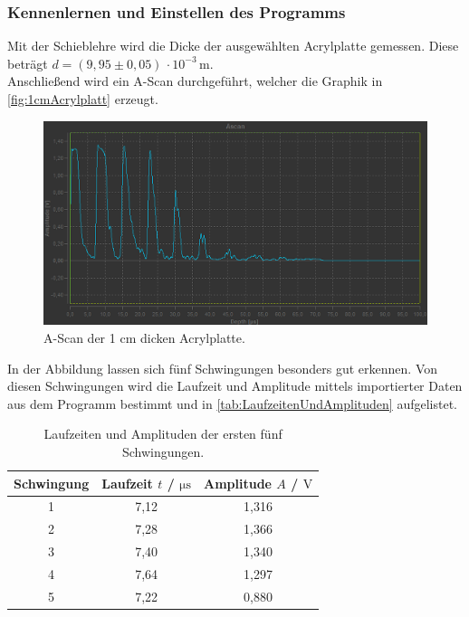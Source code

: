 \subsubsection{Kennenlernen und Einstellen des Programms}

Mit der Schieblehre wird die Dicke der ausgewählten Acrylplatte gemessen. Diese beträgt $d=(9,95 \pm 0,05) \, \cdot 10^{-3} \, \mathrm{m}$.\\
Anschließend wird ein A-Scan durchgeführt, welcher die Graphik in \autoref{fig:1cmAcrylplatt} erzeugt.\\
\begin{figure}
  \centering
  \includegraphics[width=15cm]{messwerte/Vorbereitung/AScan_Vorbereitung.png}
  \caption{A-Scan der 1 cm dicken Acrylplatte.}
  \label{fig:1cmAcrylplatt}
\end{figure}
In der Abbildung lassen sich fünf Schwingungen besonders gut erkennen. Von diesen Schwingungen wird die Laufzeit und
Amplitude mittels importierter Daten aus dem Programm bestimmt und in \autoref{tab:LaufzeitenUndAmplituden} aufgelistet.
\begin{table}
  \centering
  \caption{Laufzeiten und Amplituden der ersten fünf Schwingungen.}
  \label{tab:LaufzeitenUndAmplituden}
  \begin{tabular}{c | c c}
    Schwingung & Laufzeit $t$ / $\si{\micro\second}$ & Amplitude $A$ / $\si{\volt}$ \\
       \midrule
        1 & 7,12  & 1,316 \\
        2 & 7,28  & 1,366 \\
        3 & 7,40  & 1,340 \\
        4 & 7,64  & 1,297 \\
        5 & 7,22  & 0,880 \\
      \bottomrule
    \end{tabular}
\end{table}
